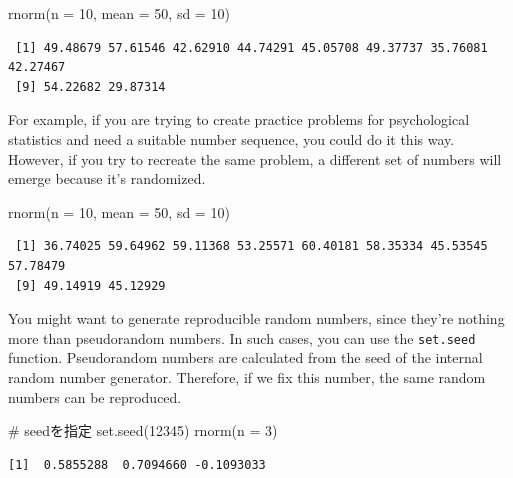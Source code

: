 \documentclass[
  a4paper,
]{book}
\newenvironment{Shaded}{\begin{snugshade}}{\end{snugshade}}
\newcommand{\AttributeTok}[1]{\textcolor[rgb]{0.40,0.45,0.13}{#1}}
\newcommand{\CommentTok}[1]{\textcolor[rgb]{0.37,0.37,0.37}{#1}}
\newcommand{\DecValTok}[1]{\textcolor[rgb]{0.68,0.00,0.00}{#1}}
\newcommand{\FunctionTok}[1]{\textcolor[rgb]{0.28,0.35,0.67}{#1}}
\newcommand{\NormalTok}[1]{\textcolor[rgb]{0.00,0.23,0.31}{#1}}
\begin{document}
\begin{Shaded}
\begin{Highlighting}[]
\FunctionTok{rnorm}\NormalTok{(}\AttributeTok{n =} \DecValTok{10}\NormalTok{, }\AttributeTok{mean =} \DecValTok{50}\NormalTok{, }\AttributeTok{sd =} \DecValTok{10}\NormalTok{)}
\end{Highlighting}
\end{Shaded}

\begin{verbatim}
 [1] 49.48679 57.61546 42.62910 44.74291 45.05708 49.37737 35.76081 42.27467
 [9] 54.22682 29.87314
\end{verbatim}

For example, if you are trying to create practice problems for
psychological statistics and need a suitable number sequence, you could
do it this way. However, if you try to recreate the same problem, a
different set of numbers will emerge because it's randomized.

\begin{Shaded}
\begin{Highlighting}[]
\FunctionTok{rnorm}\NormalTok{(}\AttributeTok{n =} \DecValTok{10}\NormalTok{, }\AttributeTok{mean =} \DecValTok{50}\NormalTok{, }\AttributeTok{sd =} \DecValTok{10}\NormalTok{)}
\end{Highlighting}
\end{Shaded}

\begin{verbatim}
 [1] 36.74025 59.64962 59.11368 53.25571 60.40181 58.35334 45.53545 57.78479
 [9] 49.14919 45.12929
\end{verbatim}

You might want to generate reproducible random numbers, since they're
nothing more than pseudorandom numbers. In such cases, you can use the
\texttt{set.seed} function. Pseudorandom numbers are calculated from the
seed of the internal random number generator. Therefore, if we fix this
number, the same random numbers can be reproduced.

\begin{Shaded}
\begin{Highlighting}[]
\CommentTok{\# seedを指定}
\FunctionTok{set.seed}\NormalTok{(}\DecValTok{12345}\NormalTok{)}
\FunctionTok{rnorm}\NormalTok{(}\AttributeTok{n =} \DecValTok{3}\NormalTok{)}
\end{Highlighting}
\end{Shaded}

\begin{verbatim}
[1]  0.5855288  0.7094660 -0.1093033
\end{verbatim}
\end{document}
